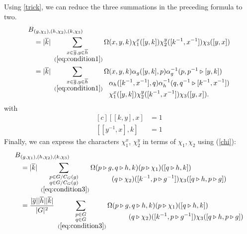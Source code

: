 \documentclass[11pt]{book}
\theoremstyle{Rem}
\theoremstyle{definition}
\numberwithin{equation}{section}
\newcommand\ol[1]{\overline{#1}}
\newcommand\hit{\triangleright}
\newcommand\inv{^{-1}}
\begin{document}
Using \cref{trick}, we can reduce the three summations in the preceding formula to two.
\begin{align*}
  B&_{(g,\chi_1),(h,\chi_2),(k,\chi_3)}\\
   &=|\ol k|\sum_{\substack{x\in\ol g,y\in\ol h \\~(\cref{eq:condition1})}}\Omega(x,y,k)\chi_1^x([y,k])\chi_2^y([k\inv,x\inv])\chi_3([y,x])\\
   &=|\ol k|\sum_{\substack{x\in\ol g,y\in\ol h \\~(\cref{eq:condition1})}}
  \begin{aligned}[t]
    \Omega&(x,y,k)\alpha_{g} ([y, k], p)\alpha^{-1}_{g}(p, p^{-1} \hit [y, k])\\
    &\alpha_{h}([k^{-1}, x^{-1}],q) \alpha^{-1}_{h} (q, q^{-1} \hit [k^{-1},x^{-1}])\\
    &\chi_1^x([y,k])\chi_2^y([k\inv,x\inv])\chi_3([y,x]).
  \end{aligned}
\end{align*}
with
\begin{equation}\label{eq:condition1}
  \begin{aligned}[c]
    [[k, y], x] &= 1\\
    [[y^{-1}, x],k]&=1
  \end{aligned}
\end{equation}
Finally, we can express the characters $\chi_1^x$, $\chi_2^y$ in terms of $\chi_1,\chi_2$ using (\cref{chi}):
\begin{align}
  B&_{(g,\chi_1),(h,\chi_2),(k,\chi_3)}\notag\\
   &=|\ol k|\sum_{\substack{p\in G/C_G(g)\\q\in G/C_G(g)\\~(\cref{eq:condition3})}}
  \begin{aligned}[t]\Omega(p\hit g&,q\hit h,k)(p\hit\chi_1)([q\hit h,k])\\
    &(q\hit \chi_2)([k\inv,p\hit g\inv])\chi_3([q\hit h,p\hit g])  
  \end{aligned}\\
   &=\frac{|\ol g||\ol h||\ol k|}{|G|^2}\sum_{\substack{p\in G\\q\in G
  \\~(\cref{eq:condition3})}}\label{eq:1}
  \begin{aligned}[t]\Omega(p\hit g&,q\hit h,k)(p\hit\chi_1)([q\hit h,k])\\
    &(q\hit \chi_2)([k\inv,p\hit g\inv])\chi_3([q\hit h,p\hit g])  
  \end{aligned}
\end{align}
\end{document}
